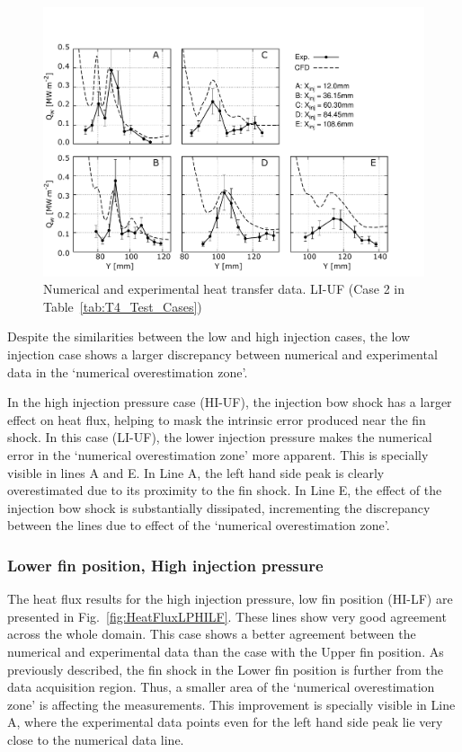 \documentclass{AIAA}
\begin{document}
\begin{figure}[!h]
\center
\includegraphics[trim = 0mm 3mm 25mm 25mm, clip, width=0.60\columnwidth,valign=t,fbox]{Figures/Data/LP_LI_UF/GNUP_CFD_GaugesLines_Multi.pdf}
\caption{Numerical and experimental heat transfer data. LI-UF (Case 2 in Table~\ref{tab:T4_Test_Cases})}
\label{fig:HeatFluxLPLIUF}
\end{figure} 
%


Despite the similarities between the low and high injection cases, the low injection case shows a larger discrepancy between numerical and experimental data in the `numerical overestimation zone'. 


In the high injection pressure case (HI-UF), the injection bow shock has a larger effect on heat flux, helping to mask the intrinsic error produced near the fin shock.
In this case (LI-UF), the lower injection pressure makes the numerical error in the `numerical overestimation zone' more apparent.
This is specially visible in lines A and E. In Line A, the left hand side peak is clearly overestimated due to its proximity to the fin shock.
In Line E, the effect of the injection bow shock is substantially dissipated, incrementing the discrepancy between the lines due to effect of the `numerical overestimation zone'.


\subsubsection{Lower fin position, High injection pressure}

The heat flux results for the high injection pressure, low fin position (HI-LF) are presented in Fig.~\ref{fig:HeatFluxLPHILF}.
These lines show very good agreement across the whole domain.
This case shows a better agreement between the numerical and experimental data than the case with the Upper fin position.
As previously described, the fin shock in the Lower fin position is further from the data acquisition region.
Thus, a smaller area of the `numerical overestimation zone' is affecting the measurements. 
This improvement is specially visible in Line A, where the experimental data points even for the left hand side peak lie very close to the numerical data line.
\end{document}
